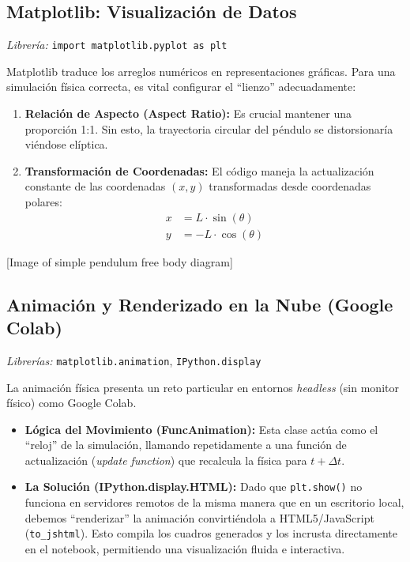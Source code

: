 \documentclass[a4paper,11pt]{article}
\newcommand{\code}[1]{\texttt{\color{blue!60!black}#1}}
\begin{document}
	\subsection{Matplotlib: Visualización de Datos}
	\textit{Librería:} \code{import matplotlib.pyplot as plt}
	
	Matplotlib traduce los arreglos numéricos en representaciones gráficas. Para una simulación física correcta, es vital configurar el ``lienzo'' adecuadamente:
	
	\begin{enumerate}
		\item \textbf{Relación de Aspecto (Aspect Ratio):} Es crucial mantener una proporción 1:1. Sin esto, la trayectoria circular del péndulo se distorsionaría viéndose elíptica.
		\item \textbf{Transformación de Coordenadas:} El código maneja la actualización constante de las coordenadas $(x, y)$ transformadas desde coordenadas polares:
		\begin{align}
			x &= L \cdot \sin(\theta) \\
			y &= -L \cdot \cos(\theta)
		\end{align}
	\end{enumerate}
	
	
	[Image of simple pendulum free body diagram]
	
	
	\subsection{Animación y Renderizado en la Nube (Google Colab)}
	\textit{Librerías:} \code{matplotlib.animation}, \code{IPython.display}
	
	La animación física presenta un reto particular en entornos \textit{headless} (sin monitor físico) como Google Colab.
	
	\begin{itemize}
		\item \textbf{Lógica del Movimiento (FuncAnimation):} Esta clase actúa como el ``reloj'' de la simulación, llamando repetidamente a una función de actualización (\textit{update function}) que recalcula la física para $t + \Delta t$.
		\item \textbf{La Solución (IPython.display.HTML):} Dado que \code{plt.show()} no funciona en servidores remotos de la misma manera que en un escritorio local, debemos ``renderizar'' la animación convirtiéndola a HTML5/JavaScript (\code{to\_jshtml}). Esto compila los cuadros generados y los incrusta directamente en el notebook, permitiendo una visualización fluida e interactiva.
	\end{itemize}
	
\end{document}
